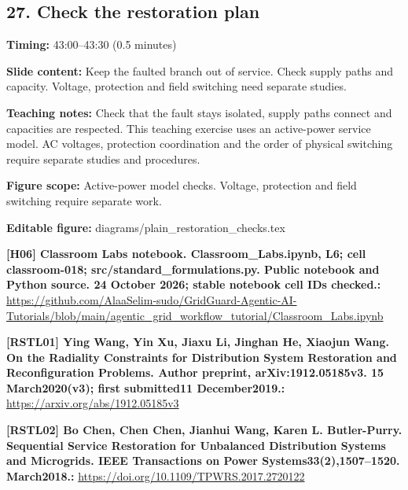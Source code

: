 \documentclass[10pt,letterpaper]{article}
\begin{document}
\subsection*{27. Check the restoration plan}
\textbf{Timing:} 43:00--43:30 (0.5 minutes)\par
\textbf{Slide content:} Keep the faulted branch out of service. Check supply paths and capacity.
Voltage, protection and field switching need separate studies.\par
\textbf{Teaching notes:} Check that the fault stays isolated, supply paths connect and capacities are respected. This teaching exercise uses an active-power service model. AC voltages, protection coordination and the order of physical switching require separate studies and procedures.\par
\textbf{Figure scope:} Active-power model checks. Voltage, protection and field switching require separate work.\par
\textbf{Editable figure:} diagrams/plain\_restoration\_checks.tex\par
\textbf{[H06] Classroom Labs notebook. Classroom\_Labs.ipynb, L6; cell classroom-018; src/standard\_formulations.py. Public notebook and Python source. 24 October 2026; stable notebook cell IDs checked.:} \href{https://github.com/AlaaSelim-sudo/GridGuard-Agentic-AI-Tutorials/blob/main/agentic_grid_workflow_tutorial/Classroom_Labs.ipynb}{\small\ttfamily https:/\allowbreak{}/\allowbreak{}github.\allowbreak{}com/\allowbreak{}AlaaSelim-\allowbreak{}sudo/\allowbreak{}GridGuard-\allowbreak{}Agentic-\allowbreak{}AI-\allowbreak{}Tutorials/\allowbreak{}blob/\allowbreak{}main/\allowbreak{}agentic\_\allowbreak{}grid\_\allowbreak{}workflow\_\allowbreak{}tutorial/\allowbreak{}Classroom\_\allowbreak{}Labs.\allowbreak{}ipynb}\par
\textbf{[RSTL01] Ying Wang, Yin Xu, Jiaxu Li, Jinghan He, Xiaojun Wang. On the Radiality Constraints for Distribution System Restoration and Reconfiguration Problems. Author preprint, arXiv:1912.05185v3. 15 March2020(v3); first submitted11 December2019.:} \href{https://arxiv.org/abs/1912.05185v3}{\small\ttfamily https:/\allowbreak{}/\allowbreak{}arxiv.\allowbreak{}org/\allowbreak{}abs/\allowbreak{}1912.\allowbreak{}05185v3}\par
\textbf{[RSTL02] Bo Chen, Chen Chen, Jianhui Wang, Karen L. Butler-Purry. Sequential Service Restoration for Unbalanced Distribution Systems and Microgrids. IEEE Transactions on Power Systems33(2),1507--1520. March2018.:} \href{https://doi.org/10.1109/TPWRS.2017.2720122}{\small\ttfamily https:/\allowbreak{}/\allowbreak{}doi.\allowbreak{}org/\allowbreak{}10.\allowbreak{}1109/\allowbreak{}TPWRS.\allowbreak{}2017.\allowbreak{}2720122}\par
\par\medskip
\end{document}
